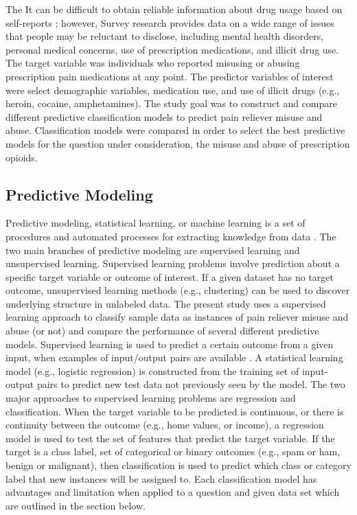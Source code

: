 \documentclass[sigconf]{acmart}
\begin{document}
 The It can be difficult to obtain reliable 
information about drug usage based on self-reports   \cite{varshney13};
however, Survey research provides data on a wide range of issues that people 
may be reluctant to disclose, including mental health disorders, personal 
medical concerns, use of prescription medications, and illicit drug use. 
The target variable was individuals who reported misusing or abusing 
prescription pain medications at any point. The predictor variables of 
interest were select demographic variables, medication use, and use of 
illicit drugs (e.g., heroin, cocaine, amphetamines). The study goal was to 
construct and compare different predictive classification models to predict 
pain reliever misuse and abuse. Classification models were compared in order 
to select the best predictive models for the question under consideration,
the misuse and abuse of prescription opioids. 

\subsection{Predictive Modeling}

Predictive modeling, statistical learning, or machine learning is a set 
of procedures and automated processes for extracting knowledge from data 
\cite{james13, kuhn17, muller17, raschka17}. The two main branches of 
predictive modeling are supervised learning and unsupervised learning. 
Supervised learning problems involve prediction about a specific target 
variable or outcome of interest. If a given dataset has no target outcome, 
unsupervised learning methods (e.g., clustering) can be used to discover 
underlying structure in unlabeled data. The present study uses a supervised 
learning approach to classify sample data as instances of pain reliever 
misuse and abuse (or not) and compare the performance of several different 
predictive models. Supervised learning is used to predict a certain outcome 
from a given input, when examples of input/output pairs are available 
\cite{muller17}. A statistical learning model (e.g., logistic regression) is 
constructed from the training set of input-output pairs to predict new test 
data not previously seen by the model. The two major approaches to supervised 
learning problems are regression and classification. When the target variable 
to be predicted is continuous, or there is continuity between the outcome 
(e.g., home values, or income), a regression model is used to test the set of 
features that predict the target variable. If the target is a class label, set 
of categorical or binary outcomes (e.g., spam or ham, benign or malignant), 
then classification is used to predict which class or category label that 
new instances will be assigned to. Each classification model has 
advantages and limitation when applied to a question and given data set
which are outlined in the section below. 
\end{document}
